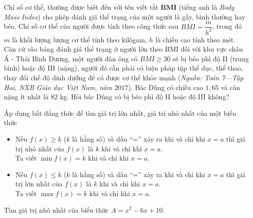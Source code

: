 \begin{vd}
	Chỉ số cơ thể, thường được biết đến với tên viết tắt \textbf{BMI} (tiếng anh là \textit{Body Mass Index}) cho phép đánh giá thể trạng của một người là gầy, bình thường hay béo. Chỉ số cơ thể của người được tính theo công thức sau $BMI=\dfrac{m}{h^2}$, trong đó $m$ là khối lượng lượng cơ thể tính theo kilôgam, $h$ là chiều cao tính theo mét. Căn cứ vào bảng đánh giá thể trạng ở người lớn theo BMI đối với khu vực châu Á - Thái Bình Dương, một người đàn ông có $BMI\geq 30$ sẽ bị béo phì độ II (trung bình) hoặc độ III (nặng), người đó cần phải có biện pháp tập thể dục, thể thao, thay đổi chế độ dinh dưỡng để có được cơ thể khỏe mạnh (\textit{Nguồn: Toán 7---Tập Hai, NXB Giáo dục Việt Nam, năm $2017$}). Bác Dũng có chiều cao $1{,}65$ và cân nặng ít nhất là $82$ kg. Hỏi bác Dũng có bị béo phì độ II hoặc độ III không? 
\end{vd}
\begin{dang}{Áp dụng bất đẳng thức để tìm giá trị lớn nhất, giá trị nhỏ nhất của một biểu thức}
	\begin{itemize}
	\item Nếu $f(x)\geq k$ ($k$ là hằng số) và dấu ``='' xảy ra khi và chỉ khi $x=a$ thì giá trị nhỏ nhất của $f(x)$ là $k$ khi và chỉ khi $x=a$.\\
	Ta viết $\min f(x)=k$ khi và chỉ khi $x=a$.
	\item Nếu $f(x)\leq k$ ($k$ là hằng số) và dấu ``='' xảy ra khi và chỉ khi $x=a$ thì giá trị lớn nhất của $f(x)$ là $k$ khi và chỉ khi $x=a$.\\
	Ta viết $\max f(x)=k$ khi và chỉ khi $x=a$.
	\end{itemize}
\end{dang}
\begin{vd}%
	Tìm giá trị nhỏ nhất của biểu thức $A=x^2-6x+10$.
\end{vd}
